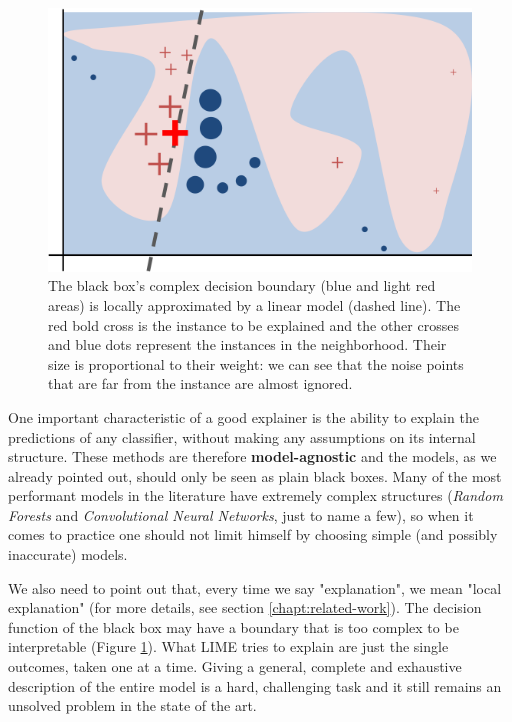 \documentclass[12pt, twoside, a4paper]{report}
\begin{document}
\begin{figure}
\begin{center}

 \includegraphics[scale=1]{images/easy_model.png}
 \end{center} 
\caption[]{The black box's complex decision boundary (blue and light red areas) is locally approximated by a linear model (dashed line). The red bold cross is the instance to be explained and the other crosses and blue dots represent the instances in the neighborhood. Their size is proportional to their weight: we can see that the noise points that are far from the instance are almost ignored.\footnotemark}
\label{fig:decision_bound}
\end{figure}


One important characteristic of a good explainer is the ability to explain the predictions of any classifier, without making any assumptions on its internal structure. These methods are therefore \textbf{model-agnostic} and the models, as we already pointed out, should only be seen as plain black boxes. Many of the most performant models in the literature have extremely complex structures (\textit{Random Forests} and \textit{Convolutional Neural Networks}, just to name a few), so when it comes to practice one should not limit himself by choosing simple (and possibly inaccurate) models.

We also need to point out that, every time we say "explanation", we mean "local explanation" (for more details, see section \ref{chapt:related-work}). The decision function of the black box may have a boundary that is too complex to be interpretable (Figure \ref{fig:decision_bound}). What LIME tries to explain are just the single outcomes, taken one at a time. Giving a general, complete and exhaustive description of the entire model is a hard, challenging task and it still remains an unsolved problem in the state of the art.
\end{document}
